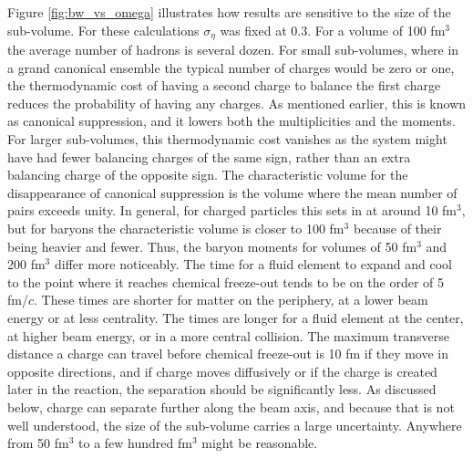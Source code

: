 Figure \ref{fig:bw_vs_omega} illustrates how results are sensitive to the size of the sub-volume. For these calculations $\sigma_\eta$ was fixed at 0.3. For a volume of 100 fm$^3$ the average number of hadrons is several dozen. For small sub-volumes, where in a grand canonical ensemble the typical number of charges would be zero or one, the thermodynamic cost of having a second charge to balance the first charge reduces the probability of having any charges. As mentioned earlier, this is known as canonical suppression, and it lowers both the multiplicities and the moments. For larger sub-volumes, this thermodynamic cost vanishes as the system might have had fewer balancing charges of the same sign, rather than an extra balancing charge of the opposite sign. The characteristic volume for the disappearance of canonical suppression is the volume where the mean number of pairs exceeds unity. In general, for charged particles this sets in at around 10 fm$^3$, but for baryons the characteristic volume is closer to 100 fm$^3$ because of their being heavier and fewer. Thus, the baryon moments for volumes of 50 fm$^3$ and 200 fm$^3$ differ more noticeably. The time for a fluid element to expand and cool to the point where it reaches chemical freeze-out tends to be on the order of 5 fm/$c$. These times are shorter for matter on the periphery, at a lower beam energy or at less centrality. The times are longer for a fluid element at the center, at higher beam energy, or in a more central collision. The maximum transverse distance a charge can travel before chemical freeze-out is 10 fm if they move in opposite directions, and if charge moves diffusively or if the charge is created later in the reaction, the separation should be significantly less. As discussed below, charge can separate further along the beam axis, and because that is not well understood, the size of the sub-volume carries a large uncertainty. Anywhere from 50 fm$^3$ to a few hundred fm$^3$ might be reasonable. 

